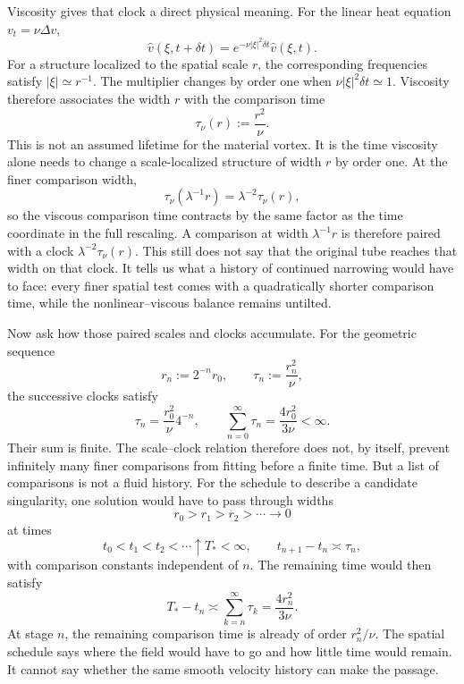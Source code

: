
Viscosity gives that clock a direct physical meaning.
For the linear heat equation \(v_t=\nu\Delta v\),
\[
  \widehat v(\xi,t+\delta t)
  =
  e^{-\nu|\xi|^2\delta t}\widehat v(\xi,t).
\]
For a structure localized to the spatial scale \(r\), the corresponding frequencies satisfy \(|\xi|\simeq r^{-1}\).
The multiplier changes by order one when \(\nu|\xi|^2\delta t\simeq1\).
Viscosity therefore associates the width \(r\) with the comparison time
\[
  \tau_\nu(r)
  :=
  \frac{r^2}{\nu}.
\]
This is not an assumed lifetime for the material vortex.
It is the time viscosity alone needs to change a scale-localized structure of width \(r\) by order one.
At the finer comparison width,
\[
  \tau_\nu(\lambda^{-1}r)
  =
  \lambda^{-2}\tau_\nu(r),
\]
so the viscous comparison time contracts by the same factor as the time coordinate in the full \NavierStokes{} rescaling.
A comparison at width \(\lambda^{-1}r\) is therefore paired with a clock \(\lambda^{-2}\tau_\nu(r)\).
This still does not say that the original tube reaches that width on that clock.
It tells us what a history of continued narrowing would have to face: every finer spatial test comes with a quadratically shorter comparison time, while the nonlinear--viscous balance remains untilted.


Now ask how those paired scales and clocks accumulate.
For the geometric sequence
\[
  r_n:=2^{-n}r_0,
  \qquad
  \tau_n:=\frac{r_n^2}{\nu},
\]
the successive clocks satisfy
\[
  \tau_n
  =
  \frac{r_0^2}{\nu}4^{-n},
  \qquad
  \sum_{n=0}^{\infty}\tau_n
  =
  \frac{4r_0^2}{3\nu}
  <
  \infty.
\]
Their sum is finite.
The scale--clock relation therefore does not, by itself, prevent infinitely many finer comparisons from fitting before a finite time.
But a list of comparisons is not a fluid history.
For the schedule to describe a candidate singularity, one solution would have to pass through widths
\[
  r_0>r_1>r_2>\cdots\longrightarrow0
\]
at times
\[
  t_0<t_1<t_2<\cdots\uparrow T_*<\infty,
  \qquad
  t_{n+1}-t_n\asymp\tau_n,
\]
with comparison constants independent of \(n\).
The remaining time would then satisfy
\[
  T_*-t_n
  \asymp
  \sum_{k=n}^{\infty}\tau_k
  =
  \frac{4r_n^2}{3\nu}.
\]
At stage \(n\), the remaining comparison time is already of order \(r_n^2/\nu\).
The spatial schedule says where the field would have to go and how little time would remain.
It cannot say whether the same smooth velocity history can make the passage.

